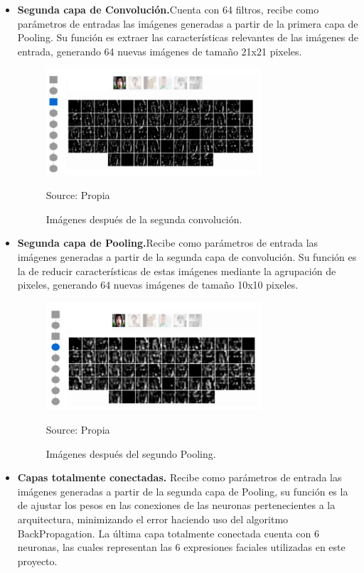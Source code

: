 \begin{itemize}
\item
{
\textbf{Segunda capa de Convolución.}Cuenta con 64 filtros, recibe como parámetros
de entradas las imágenes generadas a partir de la primera capa de Pooling. Su
función es extraer las características relevantes de las imágenes de entrada,
generando 64 nuevas imágenes de tamaño 21x21 pixeles.
\begin{figure}[H]
		\centering
		\includegraphics[width=80mm]{./Imagenes/filtro3.png}
		\caption{Imágenes después de la segunda convolución.}
		Source: Propia
		\label{fig:filtro3}
\end{figure}
}

\item
{
\textbf{Segunda capa de Pooling.}Recibe como parámetros de entrada
las imágenes generadas a partir de la segunda capa de convolución. Su función es
la de reducir características de estas imágenes mediante la agrupación de pixeles,
generando 64 nuevas imágenes de tamaño 10x10 pixeles.
\begin{figure}[H]
		\centering
		\includegraphics[width=80mm]{./Imagenes/filtro4.png}
		\caption{Imágenes después del segundo Pooling.}
		Source: Propia
		\label{fig:filtro4}
\end{figure}
}
\item
{
\textbf{Capas totalmente conectadas.}
Recibe como parámetros de entrada las imágenes
generadas a partir de la segunda capa de Pooling, su función es la de ajustar los
pesos en las conexiones de las neuronas pertenecientes a la arquitectura,
minimizando el error haciendo uso del algoritmo BackPropagation. La última
capa totalmente conectada cuenta con 6 neuronas, las cuales representan las 6
expresiones faciales utilizadas en este proyecto.
}
\end{itemize}

